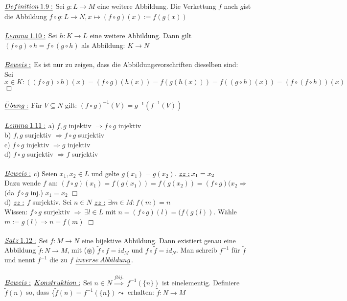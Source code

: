 \documentclass[fleqn, a4paper, 11pt]{article}
\begin{document}
$\uline{Definition\:1.9:}$ Sei $g:L\rightarrow M$ eine weitere Abbildung. Die Verkettung \dq$f$ nach $g$\dq  ist die Abbildung $f\circ g:L\rightarrow N,x\mapsto (f\circ g)(x):=f(g(x))$ \\
\\
$\uline{Lemma\:1.10:}$ Sei $h:K\rightarrow L$ eine weitere Abbildung. Dann gilt $(f\circ g)\circ h = f\circ(g\circ h)$ als Abbildung: $K\rightarrow N$\\
\\
$\uline{Beweis:}$ Es ist nur zu zeigen, dass die Abbildungsvorschriften dieselben sind:\\
Sei $x\in K:((f\circ g)\circ h)(x)=(f\circ g)(h(x))=f(g(h(x)))=f((g\circ h)(x))=(f\circ(f\circ h))(x)\:$ \hfill $\Box$\\
\\
$\uline{\ddot{U}bung:}$ F\"ur $V\subseteq N$ gilt: $(f\circ g)^{-1}(V)=g^{-1}(f^{-1}(V))$\\
\\
$\uline{Lemma\:1.11:}$ a) $f,g$ injektiv $\Rightarrow f\circ g$ injektiv\\
b) $f,g$ surjektiv $\Rightarrow f\circ g$ surjektiv\\
c) $f\circ g$ injektiv $\Rightarrow g$ injektiv\\
d) $f\circ g$ surjektiv $\Rightarrow f$ surjektiv\\
\\
$\uline{Beweis:}$ c) Seien $x_{1},x_{2}\in L$ und gelte $g(x_{1})=g(x_{2}).$ $\uline{zz:}\:x_{1}=x_{2}$\\
Dazu wende $f$ an: $(f\circ g)(x_{1})=f(g(x_{1}))=f(g(x_{2}))=(f\circ g)(x_{2}\Rightarrow$ (da $f\circ g$ inj.) $x_{1}=x_{2}$ \hfill $\Box$\\
d) $\uline{zz:}$ $f$ surjektiv. Sei $n\in N$ $\uline{zz:}$ $\exists m\in M:f(m)=n$\\
Wissen: $f\circ g$ surjektiv $\Rightarrow\:\exists l\in L$ mit $n=(f\circ g)(l)=(f(g(l))$. W\"ahle $m:=g(l) \Rightarrow n=f(m)$ \hfill $\Box$\\
\\
$\uline{Satz\:1.12:}$ Sei $f:M\rightarrow N$ eine bijektive Abbildung. Dann existiert genau eine Abbildung $\tilde{f}:N\rightarrow M$, mit ($\circledast$) $\tilde{f}\circ f=id_{M}$ und $f\circ\tilde{f}=id_{N}$. Man schreib $f^{-1}$ f\"ur $\tilde{f}$ und nennt $f^{-1}$ die zu $f$ $\uline{inverse\:Abbildung}$.\\
\\
$\uline{Beweis:}$ $\uline{Konstruktion:}$ Sei $n\in N\stackrel{f bij.}{\Rightarrow}\:f^{-1}(\{n\})$ ist einelementig. Definiere $\tilde{f}(n)$ so, dass $\{\tilde{f}(n)=f^{-1}(\{n\}) \leadsto$ erhalten: $\tilde{f}:N\rightarrow M$\\
\end{document}
